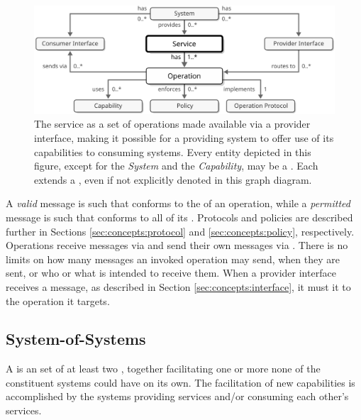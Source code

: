 \begin{figure}[ht!]
  \centering
  \includegraphics[scale=0.9]{figures/service}
  \caption{
    The service as a set of operations made available via a provider interface, making it possible for a providing system to offer use of its capabilities to consuming systems.
    Every entity depicted in this figure, except for the \textit{System} and the \textit{Capability}, may be a .
    Each  extends a , even if not explicitly denoted in this graph diagram.
  }
  \label{fig:service}
\end{figure}

A \textit{valid} message is such that conforms to the  of an operation, while a \textit{permitted} message is such that conforms to all of its .
Protocols and policies are described further in Sections \ref{sec:concepts:protocol} and \ref{sec:concepts:policy}, respectively.
Operations receive messages via  and send their own messages via .
There is no limits on how many messages an invoked operation may send, when they are sent, or who or what is intended to receive them.
When a provider interface receives a message, as described in Section \ref{sec:concepts:interface}, it must  it to the operation it targets.

\subsection{System-of-Systems}
\label{sec:concepts:sos}

A  is an  set of at least two , together facilitating one or more  none of the constituent systems could have on its own.
The facilitation of new capabilities is accomplished by the systems providing services and/or consuming each other's services.


